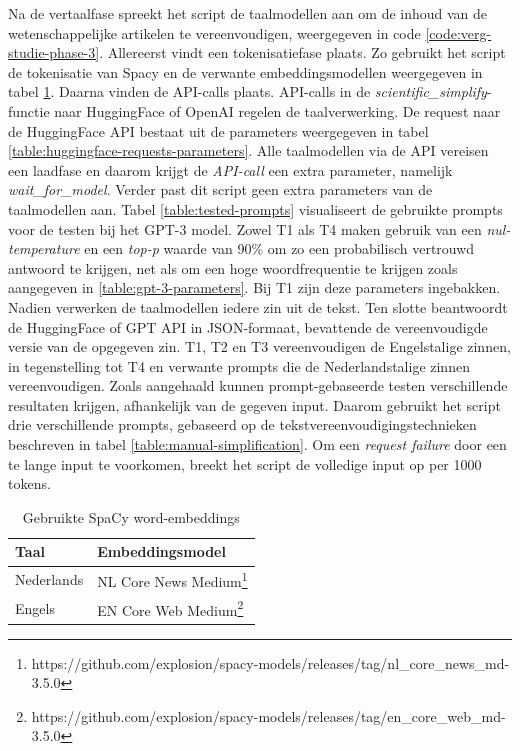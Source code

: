 Na de vertaalfase spreekt het script de taalmodellen aan om de inhoud van de wetenschappelijke artikelen te vereenvoudigen, weergegeven in code \ref{code:verg-studie-phase-3}. Allereerst vindt een tokenisatiefase plaats. Zo gebruikt het script de tokenisatie van Spacy en de verwante embeddingsmodellen weergegeven in tabel \ref{table:wordembeddings-spacy}. Daarna vinden de API-calls plaats. API-calls in de \textit{scientific\_simplify}-functie naar HuggingFace of OpenAI regelen de taalverwerking. De request naar de HuggingFace API bestaat uit de parameters weergegeven in tabel \ref{table:huggingface-requests-parameters}. Alle taalmodellen via de API vereisen een laadfase en daarom krijgt de \textit{API-call} een extra parameter, namelijk \textit{wait\_for\_model}. Verder past dit script geen extra parameters van de taalmodellen aan. Tabel \ref{table:tested-prompts} visualiseert de gebruikte prompts voor de testen bij het GPT-3 model. Zowel T1 als T4 maken gebruik van een \textit{nul-temperature} en een \textit{top-p} waarde van 90\% om zo een probabilisch vertrouwd antwoord te krijgen, net als om een hoge woordfrequentie te krijgen zoals aangegeven in \ref{table:gpt-3-parameters}. Bij T1 zijn deze parameters ingebakken. Nadien verwerken de taalmodellen iedere zin uit de tekst. Ten slotte beantwoordt de HuggingFace of GPT API in JSON-formaat, bevattende de vereenvoudigde versie van de opgegeven zin. T1, T2 en T3 vereenvoudigen de Engelstalige zinnen, in tegenstelling tot T4 en verwante prompts die de Nederlandstalige zinnen vereenvoudigen. Zoals aangehaald kunnen prompt-gebaseerde testen verschillende resultaten krijgen, afhankelijk van de gegeven input. Daarom gebruikt het script drie verschillende prompts, gebaseerd op de tekstvereenvoudigingstechnieken beschreven in tabel \ref{table:manual-simplification}. Om een \textit{request failure} door een te lange input te voorkomen, breekt het script de volledige input op per 1000 tokens.


\begin{center}
	\begin{table}[H]
		\begin{tabular}{ | m{7cm} | m{7cm} | } 
			\hline
			\textbf{Taal} & \textbf{Embeddingsmodel} \\
			\hline
			Nederlands & NL Core News Medium\footnote{https://github.com/explosion/spacy-models/releases/tag/nl_core_news_md-3.5.0} \\ 
			\hline
			Engels & EN Core Web Medium\footnote{https://github.com/explosion/spacy-models/releases/tag/en_core_web_md-3.5.0} \\
			\hline
		\end{tabular}
		\caption{Gebruikte SpaCy word-embeddings}
		\label{table:wordembeddings-spacy}
	\end{table}
\end{center}

